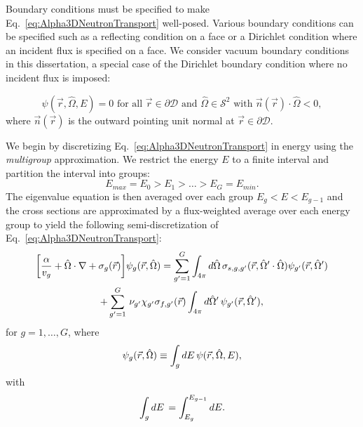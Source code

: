 Boundary conditions must be specified to make Eq.~\ref{eq:Alpha3DNeutronTransport} well-posed. Various boundary conditions can be specified such as a reflecting condition on a face or a Dirichlet condition where an incident flux is specified on a face. We consider vacuum boundary conditions in this dissertation, a special case of the Dirichlet boundary condition where no incident flux is imposed:

\begin{equation}
	\psi(\vec{r},\hat{\Omega},E) = 0 \text{ for all } \vec{r} \in \partial \mathcal{D} \text{ and } \hat{\Omega} \in \mathcal{S}^{2} \text{ with } \vec{n}(\vec{r}) \cdot \hat{\Omega} < 0,
\end{equation}
where $\vec{n}(\vec{r})$ is the outward pointing unit normal at $\vec{r} \in \partial \mathcal{D}$.

We begin by discretizing Eq.~\ref{eq:Alpha3DNeutronTransport} in energy using the \textit{multigroup} approximation. We restrict the energy $E$ to a finite interval and partition the interval into groups:
\begin{equation*}
	E_{max} = E_{0} > E_{1} > \dots > E_{G} = E_{min}.
\end{equation*}
The eigenvalue equation is then averaged over each group $E_{g} < E < E_{g-1}$ and the cross sections are approximated by a flux-weighted average over each energy group to yield the following semi-discretization of Eq.~\ref{eq:Alpha3DNeutronTransport}:
\begin{multline}
	\bigg [ \frac{\alpha}{v_{g}} + \hat{\Omega} \cdot \nabla + \sigma_{g}(\vec{r}) \bigg ] \psi_{g}(\vec{r},\hat{\Omega}) = \sum_{g'=1}^{G} \int_{4\pi} \mathop{}\!d \hat{\Omega} \, \sigma_{s,g,g'}(\vec{r},\hat{\Omega}' \cdot \hat{\Omega}) \psi_{g'}(\vec{r},\hat{\Omega}') \\ + \sum_{g'=1}^{G} \, \nu_{g'} \chi_{g'} \sigma_{f,g'}(\vec{r}) \int_{4\pi} \mathop{}\!d \hat{\Omega}' \, \psi_{g'}(\vec{r},\hat{\Omega}'), 
	\label{eq:Alpha3DMG}
\end{multline}
for $g = 1, \dots, G$, where
\begin{equation}
	\psi_{g}(\vec{r},\hat{\Omega}) \equiv \int_{g} \mathop{}\!d E \, \psi(\vec{r},\hat{\Omega},E),
\end{equation}
with
\begin{equation}
	\int_{g} \mathop{}\!d E \, = \int_{E_{g}}^{E_{g-1}} \mathop{}\!d E.
\end{equation}

